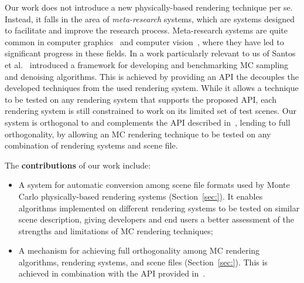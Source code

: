 Our work does not introduce a new physically-based rendering technique per se. Instead, it falls in the area of {\it meta-research} systems, which are systems designed to facilitate and improve the research process. Meta-research systems are quite common in computer graphics~\cite{Santos:2018:FBKSD, Ragan-Kelley2012,Buck2004,Mark2003} and computer vision~\cite{MiddleburyStereo, MiddleburyFlow, AlphaMatting, VideoMatting}, where they have led to significant progress in these fields. In a work particularly relevant to us of Santos et al.~\cite{Santos:2018:FBKSD} introduced a framework for developing and benchmarking MC sampling and denoising algorithms. This is achieved by providing an API the decouples the developed techniques from the used rendering system. While it allows a technique to be tested on any rendering system that supports the proposed API, each rendering system is still constrained to work on its limited set of test scenes. Our system is orthogonal to and complements the API described in~\cite{Santos:2018:FBKSD}, lending to full orthogonality, by allowing an MC rendering technique to be tested on any combination of rendering systems and scene file.     

The {\bf contributions} of our work include:
\begin{itemize}
	\item A system for automatic conversion among scene file formats used by Monte Carlo physically-based rendering systems (Section~\ref{sec:}).
	It enables algorithms implemented on different rendering systems to be tested on similar scene description, giving developers and end users a better assessment of the strengths and limitations of MC rendering techniques;
	\item A mechanism for achieving full orthogonality among MC rendering algorithms, rendering systems, and scene files (Section~\ref{sec:}). This is achieved in combination with the API provided in~\cite{Santos:2018:FBKSD}. 
\end{itemize}

